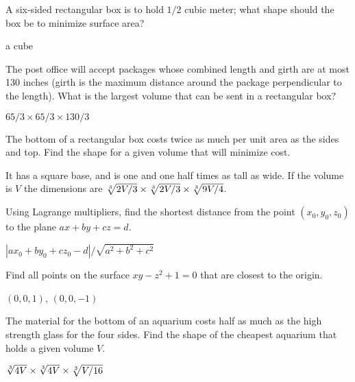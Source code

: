 \begin{exercises}

\begin{exercise} A six-sided rectangular box is to hold $1/2$ cubic meter;
what shape should the box be to minimize surface area?
\begin{answer} a cube
\end{answer}\end{exercise}

\begin{exercise} The post office will accept packages whose combined length
and girth are at most 130 inches (girth is the maximum distance around
the package perpendicular to the length). What is the largest volume
that can be sent in a rectangular box?
\begin{answer} $65/3\times 65/3\times 130/3$
\end{answer}\end{exercise}

\begin{exercise} The bottom of a rectangular box costs twice as much per unit
area as the sides and top. Find the shape for a given volume that will
minimize cost.
\begin{answer} It has a square base, and is one and one half times as tall as wide.
If the volume is $V$ the dimensions are $\root 3 \of {2V/3}\times
\root 3 \of {2V/3}\times \root 3\of {9V/4}$.
\end{answer}\end{exercise}

\begin{exercise} Using Lagrange multipliers, find the shortest
distance from the point $(x_0,y_0,z_0)$ to the plane $ax+by+cz=d$.
\begin{answer} $|ax_0+by_0+cz_0-d|/\sqrt{a^2+b^2+c^2}$
\end{answer}\end{exercise}

\begin{exercise} Find all points on the surface $xy-z^2+1=0$ that are closest
to the origin.
\begin{answer} $(0,0,1)$, $(0,0,-1)$
\end{answer}\end{exercise}

\begin{exercise} The material for the bottom of an aquarium costs half as
much as the high strength glass for the four sides. Find the shape of
the cheapest aquarium that holds a given volume $V$.
\begin{answer} $\root 3\of{4V}\times\root 3\of{4V}\times\root 3\of{V/16}$
\end{answer}\end{exercise}


\end{exercises}
